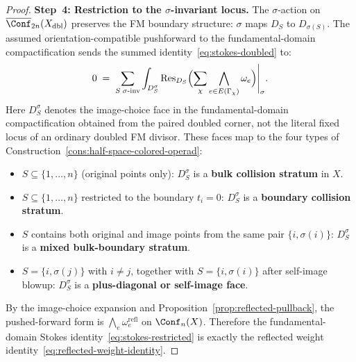 \begin{proof}
\medskip\noindent\textbf{Step~4: Restriction to the
$\sigma$-invariant locus.}
The $\sigma$-action on $\overline{\Conf}_{2n}(X_{\mathrm{dbl}})$
preserves the FM boundary structure: $\sigma$ maps $D_S$ to
$D_{\sigma(S)}$. The assumed orientation-compatible pushforward to the
fundamental-domain compactification sends the summed
identity~\eqref{eq:stokes-doubled} to:
\begin{equation}\label{eq:stokes-restricted}
0
\;=\;
\sum_{S\;\sigma\text{-inv}}
\int_{D_S^{\sigma}}
\operatorname{Res}_{D_S}\Bigl(
\sum_\chi\bigwedge_{e\in E(\Gamma_\chi)}\omega_e\Bigr)\Bigg|_{\sigma}.
\end{equation}
Here $D_S^\sigma$ denotes the image-choice face in the
fundamental-domain compactification obtained from the paired doubled
corner, not the literal fixed locus of an ordinary doubled FM divisor.
These faces map to the four types of
Construction~\ref{cons:half-space-colored-operad}:
\begin{itemize}
\item $S\subseteq\{1,\ldots,n\}$ (original points only): $D_S^{\sigma}$
 is a \textbf{bulk collision stratum} in $X$.
\item $S\subseteq\{1,\ldots,n\}$ restricted to the boundary
 $t_i=0$: $D_S^{\sigma}$ is a \textbf{boundary collision stratum}.
\item $S$ contains both original and image points from the same pair
 $\{i,\sigma(i)\}$: $D_S^{\sigma}$ is a \textbf{mixed
 bulk-boundary stratum}.
\item $S=\{i,\sigma(j)\}$ with $i\neq j$, together with
 $S=\{i,\sigma(i)\}$ after self-image blowup: $D_S^\sigma$ is a
 \textbf{plus-diagonal or self-image face}.
\end{itemize}
By the image-choice expansion and Proposition~\ref{prop:reflected-pullback},
the pushed-forward form is
$\bigwedge_e\omega_e^{\mathrm{refl}}$ on $\Conf_n(X)$. Therefore
the fundamental-domain Stokes
identity~\eqref{eq:stokes-restricted} is exactly the reflected
weight identity~\eqref{eq:reflected-weight-identity}.
\end{proof}

